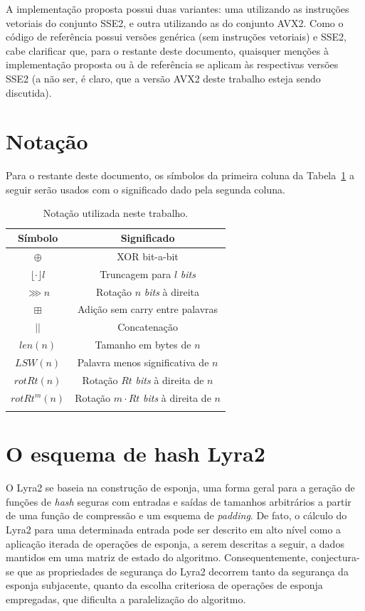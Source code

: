 \documentclass{article}
\begin{document}
A implementação proposta possui duas variantes: uma utilizando as instruções
vetoriais do conjunto SSE2, e outra utilizando as do conjunto AVX2. Como o
código de referência possui versões genérica (sem instruções vetoriais) e SSE2,
cabe clarificar que, para o restante deste documento, quaisquer menções à
implementação proposta ou à de referência se aplicam às respectivas versões
SSE2 (a não ser, é claro, que a versão AVX2 deste trabalho esteja sendo
discutida).

\section{Notação}

Para o restante deste documento, os símbolos da primeira coluna da
Tabela~\ref{tb:notation} a seguir serão usados com o significado dado pela segunda coluna.

\begin{longtable}[c]{@{}cc@{}}
\toprule
Símbolo & Significado\tabularnewline
\midrule
\endhead
$\oplus$ & XOR bit-a-bit\tabularnewline
$\lfloor \cdot \rfloor l$ & Truncagem para $l$ \emph{bits}\tabularnewline
$\ggg n$ & Rotação $n$ \emph{bits} à direita\tabularnewline
$\boxplus$ & Adição sem carry entre palavras\tabularnewline
$||$ & Concatenação\tabularnewline
$len(n)$ & Tamanho em bytes de $n$\tabularnewline
$LSW(n)$ & Palavra menos significativa de $n$\tabularnewline
$rotRt(n)$ & Rotação $Rt$ \emph{bits} à direita de $n$\tabularnewline
$rotRt^{m}(n)$ & Rotação $m \cdot Rt$ \emph{bits} à direita de
$n$\tabularnewline
\bottomrule
\caption{\label{tb:notation} Notação utilizada neste trabalho.}
\end{longtable}
\vspace{-1cm}

\section{O esquema de hash Lyra2}

O Lyra2 se baseia na construção de esponja, uma forma geral para a
geração de funções de \emph{hash} seguras com entradas e saídas de
tamanhos arbitrários a partir de uma função de compressão e um esquema
de \emph{padding}. De fato, o cálculo do Lyra2 para uma determinada entrada pode ser
descrito em alto nível como a aplicação iterada de operações de esponja,
a serem descritas a seguir, a dados mantidos em uma matriz de estado do
algoritmo. Consequentemente, conjectura-se que as propriedades de
segurança do Lyra2 decorrem tanto da segurança da esponja subjacente,
quanto da escolha criteriosa de operações de esponja empregadas, que
dificulta a paralelização do algoritmo.
\end{document}
